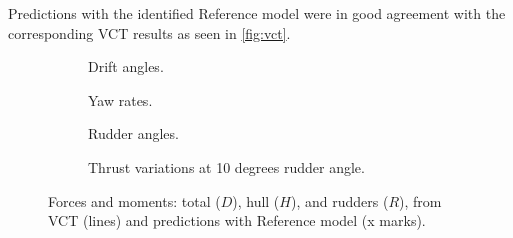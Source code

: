 Predictions with the identified Reference model were in good agreement with the corresponding VCT results as seen in \autoref{fig:vct}. 
\begin{figure}
     \centering
     \begin{subfigure}[b]{0.49\textwidth}
         \centering
         
         \caption{Drift angles.}
         \label{fig:vct_drift_angle}
     \end{subfigure}
     \hfill
     \begin{subfigure}[b]{0.49\textwidth}
         \centering
         
         \caption{Yaw rates.}
         \label{fig:vct_circle}
     \end{subfigure}
     \begin{subfigure}[b]{0.49\textwidth}
         \centering
         
         \caption{Rudder angles.}
         \label{fig:vct_rudder_angle}
     \end{subfigure}
     \hfill
     \begin{subfigure}[b]{0.49\textwidth}
         \centering
         
         \caption{Thrust variations at 10 degrees rudder angle.}
         \label{fig:vct_thrust_variation}
     \end{subfigure}
     \caption{Forces and moments: total ($D$), hull ($H$), and rudders ($R$), from VCT (lines) and predictions with Reference model (x marks).}
     \label{fig:vct}
\end{figure}